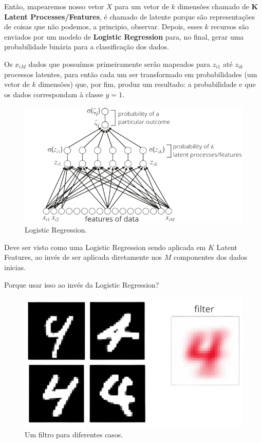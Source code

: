 \documentclass[11pt, a4paper]{article}
\begin{document}
Então, mapearemos nosso vetor $X$ para um vetor de $k$ dimensões chamado de \textbf{K Latent Processes/Features}, é chamado de latente porque são representações de coisas que não podemos, a principio, observar. Depois, esses $k$ recursos são enviados por um modelo de \textbf{Logistic Regression} para, no final, gerar uma probabilidade binária para a classificação dos dados.

Os $x_{iM}$ dados que possuímos primeiramente serão mapeados para $z_{i1}$ até $z_{ik}$ processos latentes, para então cada um ser transformado em probabilidades (um vetor de $k$ dimensões) que, por fim, produz um resultado: a probabilidade e que os dados correspondam à classe $y = 1$.

\begin{figure}[h]
\centering
\includegraphics[scale=0.3]{2ndMTP}
\caption{Logistic Regression.}
\end{figure}

\begin{center}
Deve ser visto como uma Logistic Regression sendo aplicada em $K$ Latent Features, ao invés de ser aplicada diretamente nos $M$ componentes dos dados inicias.
\end{center}

Porque usar isso ao invés da Logistic Regression?

\begin{figure}[h]
\centering
\includegraphics[scale=0.3]{3rdMTP}
\caption{Um filtro para diferentes casos.}
\end{figure}
\end{document}
